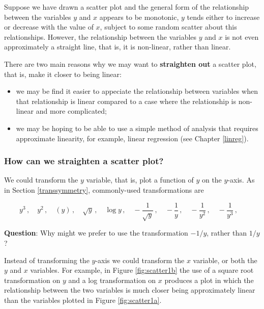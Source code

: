 \documentclass[
  11pt,
  british,
  openany, a4paper]{book}
\providecommand{\tightlist}{%
  \setlength{\itemsep}{0pt}\setlength{\parskip}{0pt}}
\begin{document}
Suppose we have drawn a scatter plot and the general form of the relationship between the variables \(y\) and \(x\) appears to be monotonic, \(y\) tends either to increase or decrease with the value of \(x\), subject to some random scatter about this relationships. However, the relationship between the variables \(y\) and \(x\) is not even approximately a straight line, that is, it is non-linear, rather than linear.

There are two main reasons why we may want to \textbf{straighten out} a scatter plot, that is, make it closer to being linear:

\begin{itemize}
\tightlist
\item
  we may be find it easier to appeciate the relationship between variables when that relationship is linear compared to a case where the relationship is non-linear and more complicated;
\item
  we may be hoping to be able to use a simple method of analysis that requires approximate linearity, for example, linear regression (see Chapter \ref{linreg}).
\end{itemize}

\hypertarget{how-can-we-straighten-a-scatter-plot}{%
\subsubsection*{How can we straighten a scatter plot?}\label{how-can-we-straighten-a-scatter-plot}}

We could transform the \(y\) variable, that is, plot a function of \(y\) on the \(y\)-axis. As in Section \ref{transsymmetry}, commonly-used transformations are

\[
y^3\,, \quad
y^2\,, \quad
(y)\,, \quad 
\sqrt{y}\,, \quad
\log y\,, \quad
-\frac{1}{\sqrt{y}}\,, \quad
-\frac1y\,, \quad
-\frac{1}{y^2}\,, \quad
-\frac{1}{y^3}\,, \quad 
\]

\textbf{Question}: Why might we prefer to use the transformation \(-1/y\), rather than \(1/y\)?

Instead of transforming the \(y\)-axis we could transform the \(x\) variable, or both the \(y\) and \(x\) variables. For example, in Figure \ref{fig:scatter1b} the use of a square root transformation on \(y\) and a log transformation on \(x\) produces a plot in which the relationship between the two variables is much closer being approximately linear than the variables plotted in Figure \ref{fig:scatter1a}.
\end{document}
